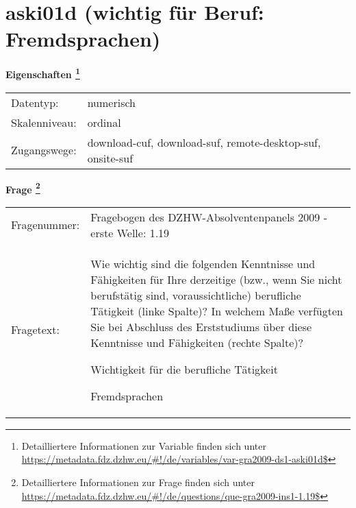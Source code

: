 
    \setcounter{footnote}{0}

    \vspace*{-1.8cm}
	\section{aski01d (wichtig für Beruf: Fremdsprachen)}
	\label{section:aski01d}



    \vspace*{0.5cm}
    \noindent\textbf{Eigenschaften
	\footnote{Detailliertere Informationen zur Variable finden sich unter
		\url{https://metadata.fdz.dzhw.eu/\#!/de/variables/var-gra2009-ds1-aski01d$}}}\\
	\begin{tabularx}{\hsize}{@{}lX}
	Datentyp: & numerisch \\
	Skalenniveau: & ordinal \\
	Zugangswege: &
	  download-cuf, 
	  download-suf, 
	  remote-desktop-suf, 
	  onsite-suf
 \\
    \end{tabularx}



				\vspace*{0.5cm}
                \noindent\textbf{Frage
	                \footnote{Detailliertere Informationen zur Frage finden sich unter
		              \url{https://metadata.fdz.dzhw.eu/\#!/de/questions/que-gra2009-ins1-1.19$}}}\\
				\begin{tabularx}{\hsize}{@{}lX}
					Fragenummer: &
					  Fragebogen des DZHW-Absolventenpanels 2009 - erste Welle:
					  1.19
 \\
					Fragetext: & Wie wichtig sind die folgenden Kenntnisse und Fähigkeiten für Ihre derzeitige (bzw., wenn Sie nicht berufstätig sind, voraussichtliche) berufliche Tätigkeit (linke Spalte)? In welchem Maße verfügten Sie bei Abschluss des Erststudiums über diese Kenntnisse und Fähigkeiten (rechte Spalte)?\par  Wichtigkeit für die berufliche Tätigkeit\par  Fremdsprachen \\
				\end{tabularx}





